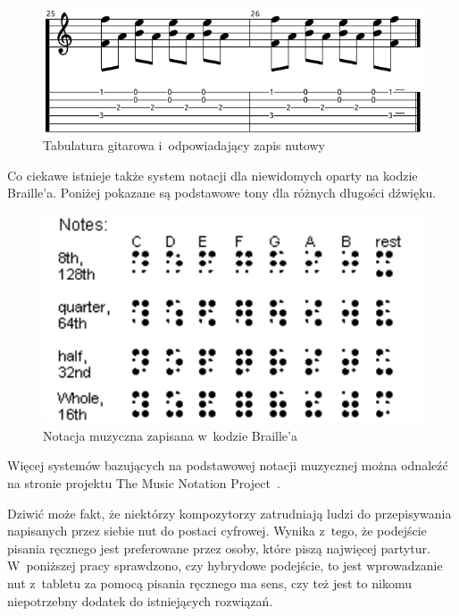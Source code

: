 \documentclass[polish,thesis,12pt]{dcsbook}
\begin{document}
\begin{figure}[H]
  \centering
  \includegraphics[scale=1.5,bb=0 0 278 92]{img/tabulatura.pdf}
  \caption{Tabulatura gitarowa i~odpowiadający zapis nutowy}
  \label{tabulatura}
\end{figure}

Co ciekawe istnieje także system notacji dla niewidomych oparty na kodzie Braille'a. Poniżej pokazane są podstawowe tony dla różnych długości dźwięku.

\begin{figure}[H]
  \centering
  \includegraphics[scale=1.3,bb=0 0 278 153]{img/braille.pdf}
  \caption{Notacja muzyczna zapisana w~kodzie Braille'a~\cite{Braille}}
  \label{braille}
\end{figure}

Więcej systemów bazujących na podstawowej notacji muzycznej można odnaleźć na stronie projektu The Music Notation Project~\cite{MusicNotationProject}.

Dziwić może fakt, że niektórzy kompozytorzy zatrudniają ludzi do przepisywania napisanych przez siebie nut do postaci cyfrowej. Wynika z~tego, że podejście pisania ręcznego jest preferowane przez osoby, które piszą najwięcej partytur. W~poniższej pracy sprawdzono, czy hybrydowe podejście, to jest wprowadzanie nut z~tabletu za pomocą pisania ręcznego ma sens, czy też jest to nikomu niepotrzebny dodatek do istniejących rozwiązań.
\end{document}
